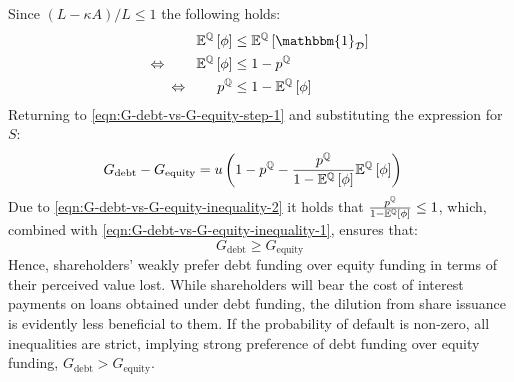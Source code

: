 \documentclass[../main.tex]{subfiles}
\begin{document}
        Since $(L-\kappa A) / L \leq 1$ the following holds:
            \begin{align}
                    \mathbb{E}^{\rnmeasure}\left[\phi\right]
                &\leq
                    \mathbb{E}^{\rnmeasure}\left[\mathbbm{1}_{\mathcal{D}} \right]
                \nonumber \\
                \Leftrightarrow 
                \qquad
                    \mathbb{E}^{\rnmeasure}\left[\phi\right]
                &\leq
                    1 - p^{\rnmeasure}
                \label{eqn:G-debt-vs-G-equity-inequality-1}
                \\
                \Leftrightarrow 
                \qquad
                p^{\rnmeasure}
                &\leq 
                1 - \mathbb{E}^{\rnmeasure}\left[\phi\right]
                \label{eqn:G-debt-vs-G-equity-inequality-2}
            \end{align}
        Returning to \cref{eqn:G-debt-vs-G-equity-step-1} and substituting the expression for $S$:
            \begin{align}
                G_{\text{debt}}
                -
                G_{\text{equity}}
                &=
                    u \left(
                        1
                        -
                        p^{\mathbb{Q}}
                        -
                        \frac{
                            p^{\mathbb{Q}}
                        }{
                            1
                            -
                            \mathbb{E}^{\mathbb{Q}}\left[\phi\right]
                        } 
                        \mathbb{E}^{\mathbb{Q}}\left[\phi\right]
                    \right)
            \end{align}
        Due to \cref{eqn:G-debt-vs-G-equity-inequality-2} it holds that
        $\frac{p^{\mathbb{Q}}}{1-\mathbb{E}^{\mathbb{Q}}\left[\phi\right]} \leq 1$,
        which, combined with \cref{eqn:G-debt-vs-G-equity-inequality-1}, ensures that:
            \begin{equation}
                G_{\text{debt}}
                \geq 
                G_{\text{equity}}
                \label{eqn:G-debt-vs-G-equity}
            \end{equation}
        Hence, shareholders' weakly prefer debt funding over equity funding in terms of their perceived value lost.
        While shareholders will bear the cost of interest payments on loans obtained under debt funding,
        the dilution from share issuance is evidently less beneficial to them. 
        If the probability of default is non-zero, all inequalities are strict,
        implying strong preference of debt funding over equity funding, $G_{\text{debt}} > G_{\text{equity}}$.
        
\end{document}
